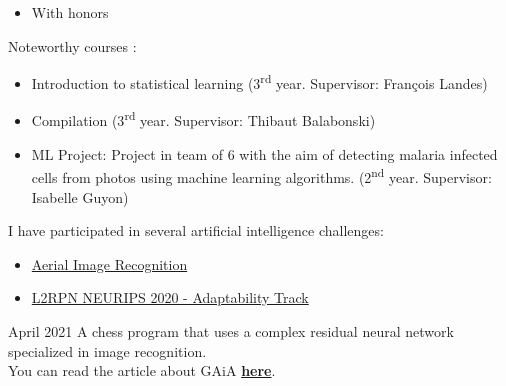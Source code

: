 \documentclass[10pt,a4paper,ragged2e,withhyper]{altacv}
\begin{document}
\begin{paracol}{2}
            \begin{itemize}
                \item With honors
            \end{itemize}

            Noteworthy courses :
            \vspace{2pt}
            \begin{itemize}
                \item Introduction to statistical learning (3\textsuperscript{rd} year. Supervisor: François Landes)
                \item Compilation (3\textsuperscript{rd} year. Supervisor: Thibaut Balabonski)
                \item ML Project: Project in team of 6 with the aim of detecting malaria infected cells from photos
                using machine learning algorithms.
                (2\textsuperscript{nd} year. Supervisor: Isabelle Guyon)
            \end{itemize}
            

        \pagebreak

          I have participated in several artificial intelligence challenges:
          \begin{itemize}
            \item \href{https://codalab.lisn.upsaclay.fr/competitions/573}{Aerial Image Recognition}
            \item \href{https://competitions.codalab.org/competitions/25427}{L2RPN NEURIPS 2020 - Adaptability Track}
          \end{itemize}

            {April 2021}{}
            A chess program that uses a complex residual neural network specialized in image recognition.\\
            You can read the article about GAiA
            \href{https://raw.githubusercontent.com/Plagiat01/GAiA/master/article/Performing%20Regression%20on%20Complex%20Data.pdf}
            {\textbf{here}}.\\
            \vspace{4pt}
            \\
            \vspace{4pt}
            \divider



\end{paracol}
\end{document}
